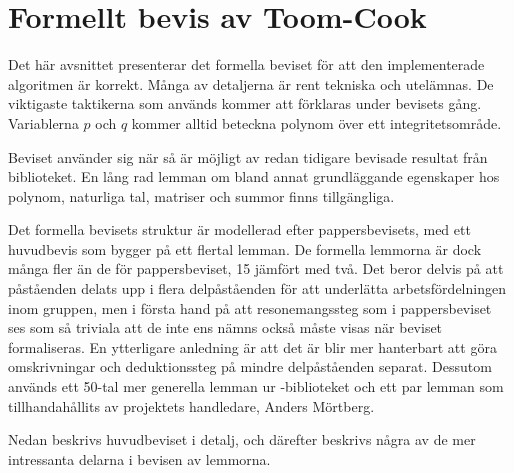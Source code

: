 \section{Formellt bevis av Toom-Cook}
\label{sec:formellbevis}
Det här avsnittet presenterar det formella beviset för att den implementerade
algoritmen är korrekt. Många av detaljerna är rent tekniska och utelämnas. De
viktigaste taktikerna som används kommer att förklaras under bevisets gång.
Variablerna $p$ och $q$ kommer alltid beteckna polynom över ett
integritetsområde.

Beviset använder sig när så är möjligt av redan tidigare bevisade resultat från
\ssr biblioteket. En lång rad lemman om bland annat grundläggande egenskaper
hos polynom, naturliga tal, matriser och summor finns tillgängliga.

Det formella bevisets struktur är modellerad efter pappersbevisets, med ett
huvudbevis som bygger på ett flertal lemman. De formella lemmorna är dock många
fler än de för pappersbeviset, 15 jämfört med två. Det beror delvis på att
påståenden delats upp i flera delpåståenden för att underlätta
arbetsfördelningen inom gruppen, men i första hand på att resonemangssteg som i
pappersbeviset ses som så triviala att de inte ens nämns också måste visas när
beviset formaliseras. En ytterligare anledning är att det är blir mer
hanterbart att göra omskrivningar och deduktionssteg på mindre delpåståenden
separat. Dessutom används ett 50-tal mer generella lemman ur \ssr-biblioteket
och ett par lemman som tillhandahållits av projektets handledare, Anders
Mörtberg.

Nedan beskrivs huvudbeviset i detalj, och därefter beskrivs några av de mer
intressanta delarna i bevisen av lemmorna.

